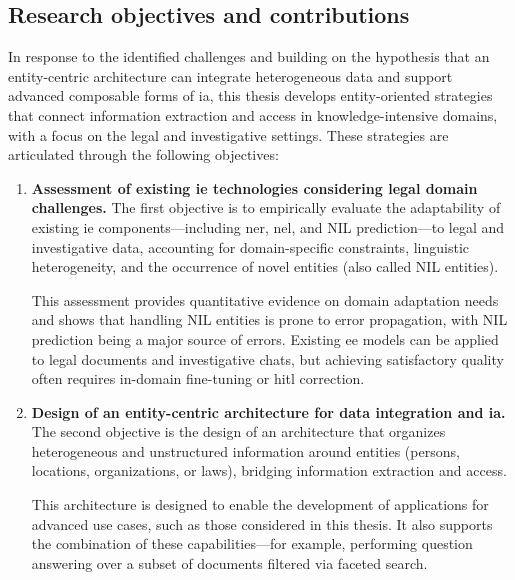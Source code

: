 \subsection{Research objectives and contributions}

In response to the identified challenges and building on the hypothesis that an entity-centric architecture can integrate heterogeneous data and support advanced composable forms of \acl{ia}, this thesis develops entity-oriented strategies that connect information extraction and access in knowledge-intensive domains, with a focus on the legal and investigative settings.  
These strategies are articulated through the following objectives:

\begin{enumerate}[leftmargin=*,label=\textit{Obj.~\arabic*:},ref=\textit{Obj.~\arabic*}]

    \item \label{ob:extraction_assessment} \textbf{Assessment of existing \acl{ie} technologies considering legal domain challenges.}  
    The first objective is to empirically evaluate the adaptability of existing \acl{ie} components---including \acl{ner}, \acl{nel}, and NIL prediction---to legal and investigative data, accounting for domain-specific constraints, linguistic heterogeneity, and the occurrence of novel entities (also called NIL entities).

    This assessment provides quantitative evidence on domain adaptation needs and shows that handling NIL entities is prone to error propagation, with NIL prediction being a major source of errors. Existing \acl{ee} models can be applied to legal documents and investigative chats, but achieving satisfactory quality often requires in-domain fine-tuning or \acl{hitl} correction.


    \item \label{ob:architecture} \textbf{Design of an entity-centric architecture for data integration and \acl{ia}.}
    The second objective is the design of an architecture that organizes heterogeneous and unstructured information around entities (\eg persons, locations, organizations, or laws), bridging information extraction and access.
    
    This architecture is designed to enable the development of applications for advanced use cases, such as those considered in this thesis. It also supports the combination of these capabilities---for example, performing question answering over a subset of documents filtered via faceted search.


\end{enumerate}
